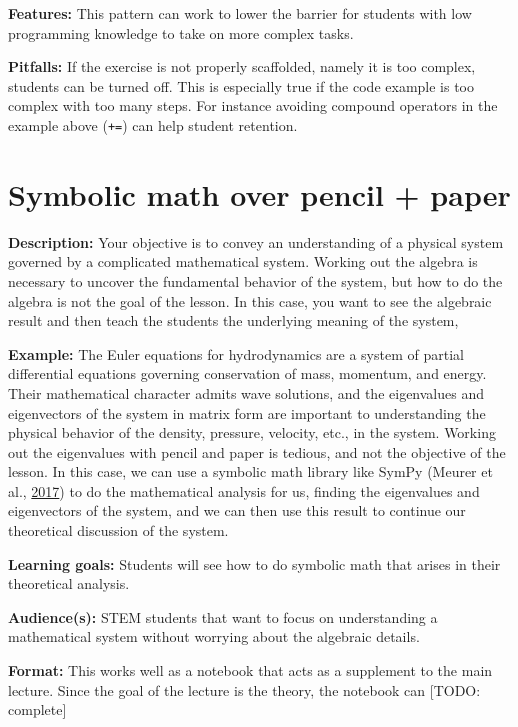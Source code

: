 \documentclass[]{book}
\begin{document}
\textbf{Features:}
This pattern can work to lower the barrier for students with low programming knowledge
to take on more complex tasks.

\textbf{Pitfalls:}
If the exercise is not properly scaffolded, namely it is too complex, students can be turned off.
This is especially true if the code example is too complex with too many steps.
For instance avoiding compound operators in the example above (\texttt{+=}) can help student retention.

\hypertarget{symbolic-math-over-pencil-paper}{%
\section{Symbolic math over pencil + paper}\label{symbolic-math-over-pencil-paper}}

\textbf{Description:}
Your objective is to convey an understanding of a physical system governed by a
complicated mathematical system. Working out the algebra is necessary to
uncover the fundamental behavior of the system, but how to do the algebra is
not the goal of the lesson. In this case, you want to see the algebraic result
and then teach the students the underlying meaning of the system,

\textbf{Example:}
The Euler equations for hydrodynamics are a system of partial differential equations
governing conservation of mass, momentum, and energy. Their mathematical character
admits wave solutions, and the eigenvalues and eigenvectors of the system in matrix
form are important to understanding the physical behavior of the density, pressure,
velocity, etc., in the system. Working out the eigenvalues with pencil and paper is tedious,
and not the objective of the lesson. In this case, we can use a symbolic math library
like SymPy (Meurer et al., \protect\hyperlink{ref-Meurer2017}{2017}) to do the mathematical analysis for us, finding the eigenvalues
and eigenvectors of the system, and we can then use this result to continue our theoretical
discussion of the system.

\textbf{Learning goals:}
Students will see how to do symbolic math that arises in their theoretical analysis.

\textbf{Audience(s):}
STEM students that want to focus on understanding a mathematical system without
worrying about the algebraic details.

\textbf{Format:}
This works well as a notebook that acts as a supplement to the main lecture.
Since the goal of the lecture is the theory, the notebook can {[}TODO: complete{]}
\end{document}
